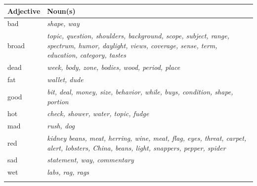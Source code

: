 \documentclass[output=paper]{langscibook}
\begin{document}
\begin{tabularx}{\textwidth}{lQ}
\lsptoprule
Adjective & Noun(s)\\\midrule
bad & \textit{shape, way}\\
broad & \textit{topic, question, shoulders, background, scope, subject, range, spectrum, humor, daylight, views, coverage, sense, term, education, category, tastes}\\
dead & \textit{week, body, zone, bodies, wood, period, place}\\
fat & \textit{wallet, dude}\\
good & \textit{bit, deal, money, size, behavior, while, buys, condition, shape, portion}\\
hot & \textit{check, shower, water, topic, fudge}\\
mad & \textit{rush, dog}\\
red & \textit{kidney beans, meat, herring, wine, meat, flag, eyes, threat, carpet, alert, lobsters, China, beans, light, snappers, pepper, spider}\\
sad & \textit{statement, way, commentary}\\
wet & \textit{labs, rag, rags}\\
\lspbottomrule
\end{tabularx}

\label{sec:bybee:Appendix2}
\end{document}

